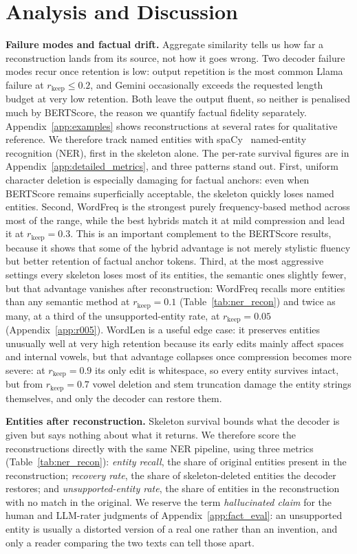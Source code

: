 \documentclass[11pt]{article}
\newcommand{\rkeep}{r_{\mathrm{keep}}}
\begin{document}
\section{Analysis and Discussion}
\label{sec:analysis}

\textbf{Failure modes and factual drift.}
Aggregate similarity tells us how far a reconstruction lands from its source, not how it goes wrong. Two decoder failure modes recur once retention is low: output repetition is the most common Llama failure at $\rkeep \le 0.2$, and Gemini occasionally exceeds the requested length budget at very low retention. Both leave the output fluent, so neither is penalised much by BERTScore, the reason we quantify factual fidelity separately. Appendix~\ref{app:examples} shows reconstructions at several rates for qualitative reference. We therefore track named entities with spaCy~\citep{honnibal2020spacy} named-entity recognition (NER), first in the skeleton alone. The per-rate survival figures are in Appendix~\ref{app:detailed_metrics}, and three patterns stand out. First, uniform character deletion is especially damaging for factual anchors: even when BERTScore remains superficially acceptable, the skeleton quickly loses named entities. Second, WordFreq is the strongest purely frequency-based method across most of the range, while the best hybrids match it at mild compression and lead it at $\rkeep = 0.3$. This is an important complement to the BERTScore results, because it shows that some of the hybrid advantage is not merely stylistic fluency but better retention of factual anchor tokens. Third, at the most aggressive settings every skeleton loses most of its entities, the semantic ones slightly fewer, but that advantage vanishes after reconstruction: WordFreq recalls more entities than any semantic method at $\rkeep = 0.1$ (Table~\ref{tab:ner_recon}) and twice as many, at a third of the unsupported-entity rate, at $\rkeep = 0.05$ (Appendix~\ref{app:r005}). WordLen is a useful edge case: it preserves entities unusually well at very high retention because its early edits mainly affect spaces and internal vowels, but that advantage collapses once compression becomes more severe: at $\rkeep = 0.9$ its only edit is whitespace, so every entity survives intact, but from $\rkeep = 0.7$ vowel deletion and stem truncation damage the entity strings themselves, and only the decoder can restore them.

\textbf{Entities after reconstruction.}
Skeleton survival bounds what the decoder is given but says nothing about what it returns. We therefore score the reconstructions directly with the same NER
pipeline, using three metrics (Table~\ref{tab:ner_recon}):
\emph{entity recall}, the share of original entities present in the reconstruction; \emph{recovery rate},
the share of skeleton-deleted entities the decoder restores; and \emph{unsupported-entity rate}, the share
of entities in the reconstruction with no match in the original. We reserve the term \emph{hallucinated
claim} for the human and LLM-rater judgments of Appendix~\ref{app:fact_eval}: an unsupported entity is
usually a distorted version of a real one rather than an invention, and only a reader comparing the two
texts can tell those apart.
\end{document}
